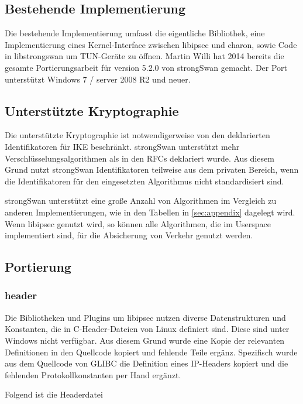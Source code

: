 \subsection{Bestehende Implementierung}
Die bestehende Implementierung umfasst die eigentliche Bibliothek, eine Implementierung
eines Kernel-Interface zwischen libipsec und charon, sowie Code in libstrongswan
um TUN-Geräte zu öffnen. Martin Willi hat 2014 bereits die gesamte Portierungsarbeit
für version 5.2.0 von strongSwan gemacht. Der Port unterstützt Windows 7 / server 2008 R2
und neuer.

\subsection{Unterstützte Kryptographie}
Die unterstützte Kryptographie ist notwendigerweise von den deklarierten Identifikatoren
für IKE beschränkt. strongSwan unterstützt mehr Verschlüsselungsalgorithmen als
in den \acp{RFC} deklariert wurde. Aus diesem Grund nutzt strongSwan Identifikatoren
teilweise aus dem privaten Bereich, wenn die Identifikatoren für den eingesetzten Algorithmus
nicht standardisiert sind.

strongSwan unterstützt eine große Anzahl von Algorithmen im Vergleich zu anderen Implementierungen,
wie in den Tabellen in \autoref{sec:appendix} dagelegt wird. Wenn libipsec genutzt wird,
so können alle Algorithmen, die im Userspace implementiert sind, für die Absicherung
von Verkehr genutzt werden.

\subsection{Portierung}
\subsubsection{header}
Die Bibliotheken und Plugins um libipsec nutzen diverse Datenstrukturen und Konstanten,
die in C-Header-Dateien von Linux definiert sind. Diese sind unter Windows nicht verfügbar.
Aus diesem Grund wurde eine Kopie der relevanten Definitionen in den Quellcode kopiert
und fehlende Teile ergänz.
Spezifisch wurde aus dem Quellcode von GLIBC die Definition eines \ac{IP}-Headers kopiert
und die fehlenden Protokollkonstanten per Hand ergänzt.

Folgend ist die Headerdatei

